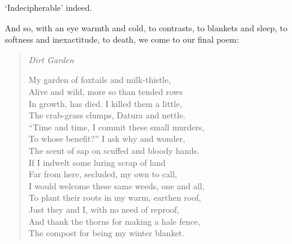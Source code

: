 \documentclass[12pt]{memoir}
\begin{document}
`Indecipherable' indeed.

And so, with an eye warmth and cold, to contrasts, to blankets and sleep, to softness and inexactitude, to death, we come to our final poem:

\begin{verse}
\emph{Dirt Garden}

My garden of foxtails and milk-thistle, \\
Alive and wild, more so than tended rows \\
In growth, has died. I killed them a little, \\
The crab-grass clumps, Datura and nettle. \\
``Time and time, I commit these small murders, \\
To whose benefit?'' I ask why and wonder, \\
The scent of sap on scuffed and bloody hands. \\
If I indwelt some luring scrap of land \\
Far from here, secluded, my own to call, \\
I would welcome these same weeds, one and all, \\
To plant their roots in my warm, earthen roof, \\
Just they and I, with no need of reproof, \\
And thank the thorns for making a hale fence, \\
The compost for being my winter blanket.

\parencite[5]{leaves}
\end{verse}
\end{document}
